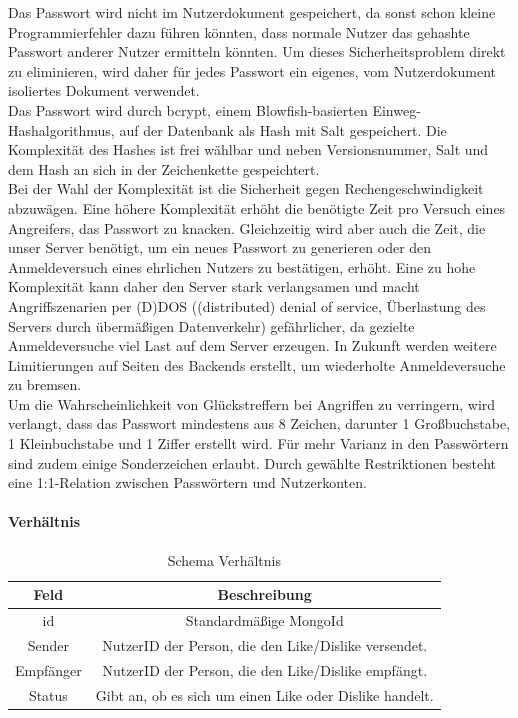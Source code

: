 Das Passwort wird nicht im Nutzerdokument gespeichert, da sonst schon kleine Programmierfehler dazu führen könnten, dass normale Nutzer das gehashte Passwort anderer Nutzer ermitteln könnten.
Um dieses Sicherheitsproblem direkt zu eliminieren, wird daher für jedes Passwort ein eigenes, vom Nutzerdokument isoliertes Dokument verwendet.\\
Das Passwort wird durch bcrypt, einem Blowfish-basierten Einweg-Hashalgorithmus, auf der Datenbank als Hash mit Salt gespeichert.
Die Komplexität des Hashes ist frei wählbar und neben Versionsnummer, Salt und dem Hash an sich in der Zeichenkette gespeichtert.\cite{db:bcrypt}\\
Bei der Wahl der Komplexität ist die Sicherheit gegen Rechengeschwindigkeit abzuwägen.
Eine höhere Komplexität erhöht die benötigte Zeit pro Versuch eines Angreifers, das Passwort zu knacken.
Gleichzeitig wird aber auch die Zeit, die unser Server benötigt, um ein neues Passwort zu generieren oder den Anmeldeversuch eines ehrlichen Nutzers zu bestätigen, erhöht.
Eine zu hohe Komplexität kann daher den Server stark verlangsamen und macht Angriffszenarien per (D)DOS ((distributed) denial of service, Überlastung des Servers durch übermäßigen Datenverkehr) gefährlicher, da gezielte Anmeldeversuche viel Last auf dem Server erzeugen.
In Zukunft werden weitere Limitierungen auf Seiten des Backends erstellt, um wiederholte Anmeldeversuche zu bremsen.\\
Um die Wahrscheinlichkeit von Glückstreffern bei Angriffen zu verringern, wird verlangt, dass das Passwort mindestens aus 8 Zeichen, darunter 1 Großbuchstabe, 1 Kleinbuchstabe und 1 Ziffer erstellt wird.
Für mehr Varianz in den Passwörtern sind zudem einige Sonderzeichen erlaubt. %
Durch gewählte Restriktionen besteht eine 1:1-Relation zwischen Passwörtern und Nutzerkonten.

\paragraph{Verhältnis\\}
\begin{table}
    \centering
    \begin{tabular}{ |c|c| }
        \hline
        Feld & Beschreibung  \\
        \hline
        id & Standardmäßige MongoId \\
        Sender & NutzerID der Person, die den Like/Dislike versendet. \\
        Empfänger &  NutzerID der Person, die den Like/Dislike empfängt. \\
        Status & Gibt an, ob es sich um einen Like oder Dislike handelt. \\
        \hline
    \end{tabular}
    \caption{Schema Verhältnis}
    \label{db:table:like}
\end{table}

